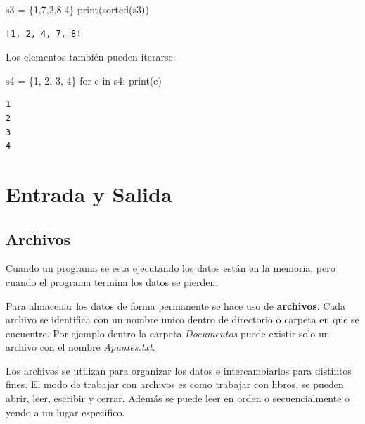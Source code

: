 \documentclass[
  letterpaper,
  DIV=11,
  numbers=noendperiod]{scrreprt}
\newenvironment{Shaded}{\begin{snugshade}}{\end{snugshade}}
\newcommand{\BuiltInTok}[1]{\textcolor[rgb]{0.00,0.23,0.31}{#1}}
\newcommand{\ControlFlowTok}[1]{\textcolor[rgb]{0.00,0.23,0.31}{#1}}
\newcommand{\DecValTok}[1]{\textcolor[rgb]{0.68,0.00,0.00}{#1}}
\newcommand{\KeywordTok}[1]{\textcolor[rgb]{0.00,0.23,0.31}{#1}}
\newcommand{\NormalTok}[1]{\textcolor[rgb]{0.00,0.23,0.31}{#1}}
\newcommand{\OperatorTok}[1]{\textcolor[rgb]{0.37,0.37,0.37}{#1}}
\begin{document}
\begin{Shaded}
\begin{Highlighting}[]
\NormalTok{s3 }\OperatorTok{=}\NormalTok{ \{}\DecValTok{1}\NormalTok{,}\DecValTok{7}\NormalTok{,}\DecValTok{2}\NormalTok{,}\DecValTok{8}\NormalTok{,}\DecValTok{4}\NormalTok{\}}
\BuiltInTok{print}\NormalTok{(}\BuiltInTok{sorted}\NormalTok{(s3))}
\end{Highlighting}
\end{Shaded}

\begin{verbatim}
[1, 2, 4, 7, 8]
\end{verbatim}

Los elementos también pueden iterarse:

\begin{Shaded}
\begin{Highlighting}[]
\NormalTok{s4 }\OperatorTok{=}\NormalTok{ \{}\DecValTok{1}\NormalTok{, }\DecValTok{2}\NormalTok{, }\DecValTok{3}\NormalTok{, }\DecValTok{4}\NormalTok{\}}
\ControlFlowTok{for}\NormalTok{ e }\KeywordTok{in}\NormalTok{ s4:}
  \BuiltInTok{print}\NormalTok{(e)}
\end{Highlighting}
\end{Shaded}

\begin{verbatim}
1
2
3
4
\end{verbatim}


\chapter{Entrada y Salida}\label{entrada-y-salida}

\section{Archivos}\label{archivos}

Cuando un programa se esta ejecutando los datos están en la memoria,
pero cuando el programa termina los datos se pierden.

Para almacenar los datos de forma permanente se hace uso de
\textbf{archivos}. Cada archivo se identifica con un nombre unico dentro
de directorio o carpeta en que se encuentre. Por ejemplo dentro la
carpeta \emph{Documentos} puede existir solo un archivo con el nombre
\emph{Apuntes.txt}.

Los archivos se utilizan para organizar los datos e intercambiarlos para
distintos fines. El modo de trabajar con archivos es como trabajar con
libros, se pueden abrir, leer, escribir y cerrar. Además se puede leer
en orden o secuencialmente o yendo a un lugar especifico.
\end{document}
